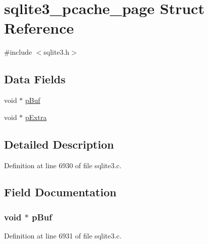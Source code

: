 \hypertarget{structsqlite3__pcache__page}{}\section{sqlite3\+\_\+pcache\+\_\+page Struct Reference}
\label{structsqlite3__pcache__page}


{\ttfamily \#include $<$sqlite3.\+h$>$}

\subsection*{Data Fields}
\begin{DoxyCompactItemize}
\item 
void $\ast$ \hyperlink{structsqlite3__pcache__page_ab3d75460084f8a8d22d0030132a97f13}{p\+Buf}
\item 
void $\ast$ \hyperlink{structsqlite3__pcache__page_acde03a4be601792bcfef6718ebe0f9ad}{p\+Extra}
\end{DoxyCompactItemize}


\subsection{Detailed Description}


Definition at line 6930 of file sqlite3.\+c.



\subsection{Field Documentation}
\hypertarget{structsqlite3__pcache__page_ab3d75460084f8a8d22d0030132a97f13}{}
\subsubsection[{p\+Buf}]{\setlength{\rightskip}{0pt plus 5cm}void $\ast$ p\+Buf}\label{structsqlite3__pcache__page_ab3d75460084f8a8d22d0030132a97f13}


Definition at line 6931 of file sqlite3.\+c.

\hypertarget{structsqlite3__pcache__page_acde03a4be601792bcfef6718ebe0f9ad}{}
